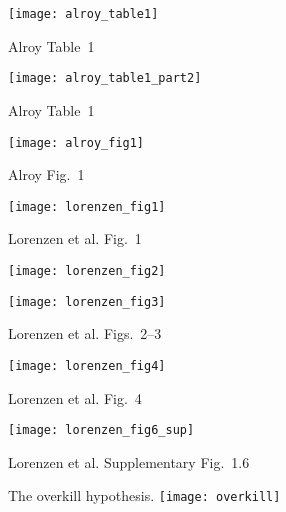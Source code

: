 \documentclass[t]{beamer}
\begin{document}
\begin{frame}
		\texttt{[image: alroy\_table1]}
		
		\tinyfill Alroy Table~1
\end{frame}

\begin{frame}
	\texttt{[image: alroy\_table1\_part2]}
	
	\tinyfill Alroy Table~1
\end{frame}

\begin{frame}
	\texttt{[image: alroy\_fig1]}

		\tinyfill Alroy Fig.~1
\end{frame}

\begin{frame}
	\centering
	\texttt{[image: lorenzen\_fig1]}
	
			\tinyfill Lorenzen et al. Fig.~1
\end{frame}


\begin{frame}
\begin{multicols}{2}
	
	\texttt{[image: lorenzen\_fig2]}
	\columnbreak
	
		\texttt{[image: lorenzen\_fig3]}		
\end{multicols}
	
	\tinyfill Lorenzen et al. Figs.~2–3
\end{frame}

\begin{frame}
	\centering
	\texttt{[image: lorenzen\_fig4]}

	\tinyfill Lorenzen et al. Fig.~4
\end{frame}

\begin{frame}
	\centering
	\texttt{[image: lorenzen\_fig6\_sup]}
	
	\tinyfill Lorenzen et al. Supplementary Fig.~1.6
\end{frame}

\begin{frame}{The overkill hypothesis.}
	\centering
	\texttt{[image: overkill]}
	
\end{frame}
\end{document}
